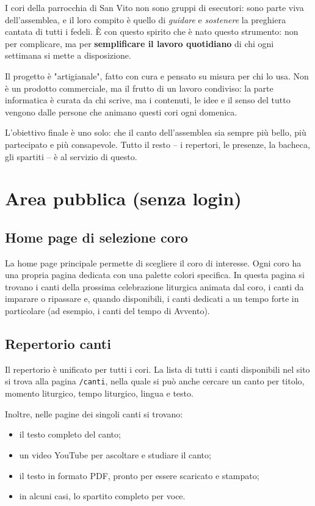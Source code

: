 \documentclass[a4paper,12pt]{article}
\begin{document}
	I cori della parrocchia di San Vito non sono gruppi di esecutori: sono parte viva dell'assemblea, e il loro compito è quello di \textit{guidare} e \textit{sostenere} la preghiera cantata di tutti i fedeli. È con questo spirito che è nato questo strumento: non per complicare, ma per \textbf{semplificare il lavoro quotidiano} di chi ogni settimana si mette a disposizione.
	
	Il progetto è "artigianale", fatto con cura e pensato su misura per chi lo usa. Non è un prodotto commerciale, ma il frutto di un lavoro condiviso: la parte informatica è curata da chi scrive, ma i contenuti, le idee e il senso del tutto vengono dalle persone che animano questi cori ogni domenica.
	
	L'obiettivo finale è uno solo: che il canto dell'assemblea sia sempre più bello, più partecipato e più consapevole. Tutto il resto -- i repertori, le presenze, la bacheca, gli spartiti -- è al servizio di questo.
	
	
	\section{Area pubblica (senza login)}
	
	\subsection{Home page di selezione coro}
	
	La home page principale permette di scegliere il coro di interesse. Ogni coro ha una propria pagina dedicata con una palette colori specifica. In questa pagina si trovano i canti della prossima celebrazione liturgica animata dal coro, i canti da imparare o ripassare e, quando disponibili, i canti dedicati a un tempo forte in particolare (ad esempio, i canti del tempo di Avvento).
	
	\subsection{Repertorio canti}
	Il repertorio è unificato per tutti i cori. La lista di tutti i canti disponibili nel sito si trova alla pagina \texttt{/canti}, nella quale si può anche cercare un canto per titolo, momento liturgico, tempo liturgico, lingua e testo.
	
	Inoltre, nelle pagine dei singoli canti si trovano:
	\begin{itemize}
		\item il testo completo del canto;
		\item un video YouTube per ascoltare e studiare il canto;
		\item il testo in formato PDF, pronto per essere scaricato e stampato;
		\item in alcuni casi, lo spartito completo per voce.
	\end{itemize}
	
\end{document}

